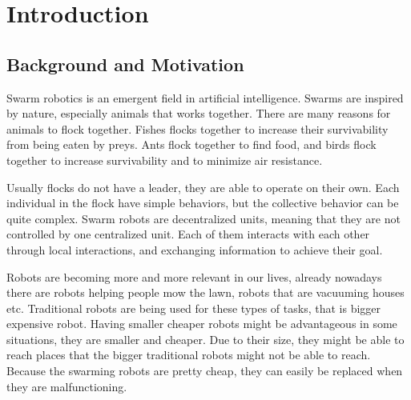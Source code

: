 \chapter{Introduction}
\label{cha:Introduction}





\section{Background and Motivation}
\label{sec:BackgroundAndMotivation}

Swarm robotics is an emergent field in artificial intelligence. Swarms are inspired by nature, especially animals that works together. There are many reasons for animals to flock together. Fishes flocks together to increase their survivability from being eaten by preys. Ants flock together to find food, and birds flock together to increase survivability and to minimize air resistance.

Usually flocks do not have a leader, they are able to operate on their own. Each individual in the flock have simple behaviors, but the collective behavior can be quite complex. Swarm robots are decentralized units, meaning that they are not controlled by one centralized unit. Each of them interacts with each other through local interactions, and exchanging information to achieve their goal.

Robots are becoming more and more relevant in our lives, already nowadays there are robots helping people mow the lawn, robots that are vacuuming houses etc. Traditional robots are being used for these types of tasks, that is bigger expensive robot. Having smaller cheaper robots might be advantageous in some situations, they are smaller and cheaper. Due to their size, they might be able to reach places that the bigger traditional robots might not be able to reach. Because the swarming robots are pretty cheap, they can easily be replaced when they are malfunctioning. 

